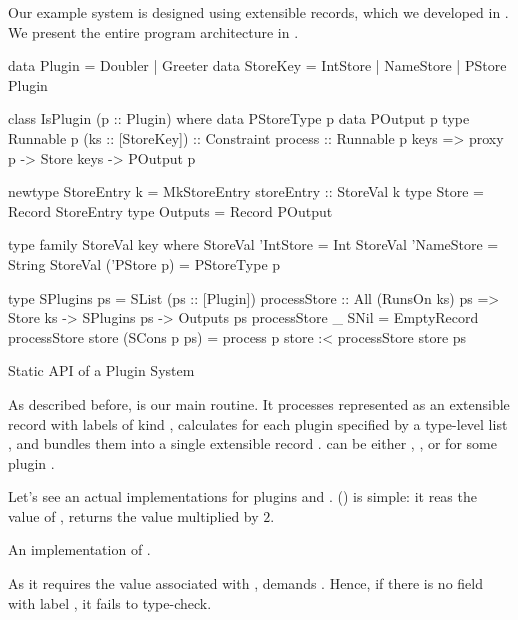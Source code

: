 \documentclass[demotion-paper.tex]{subfiles}
\begin{document}
Our example system is designed using extensible records, which we developed in .
We present the entire program architecture in .
\begin{listing}[htbp]
\begin{code}
data Plugin = Doubler | Greeter
data StoreKey = IntStore | NameStore
              | PStore Plugin

class IsPlugin (p :: Plugin) where
  data PStoreType p
  data POutput p
  type Runnable p (ks :: [StoreKey]) :: Constraint
  process :: Runnable p keys
    => proxy p -> Store keys -> POutput p

newtype StoreEntry k =
  MkStoreEntry {storeEntry :: StoreVal k}
type Store = Record StoreEntry
type Outputs = Record POutput

type family StoreVal key where
  StoreVal 'IntStore = Int
  StoreVal 'NameStore = String
  StoreVal ('PStore p) = PStoreType p

type SPlugins ps = SList (ps :: [Plugin])
processStore :: All (RunsOn ks) ps
  => Store ks -> SPlugins ps -> Outputs ps
processStore _ SNil = EmptyRecord
processStore store (SCons p ps) = 
  process p store :< processStore store ps
\end{code}
\caption{Static API of a Plugin System}
\label{lst:plugin-arch}
\end{listing}
As described before,  is our main routine.
It processes  represented as an extensible record with labels of kind , calculates  for each plugin specified by a type-level list , and bundles them into a single extensible record .
 can be either , , or  for some plugin .

Let's see an actual implementations for plugins  and .
 () is simple: it reas the value of , returns the value multiplied by $2$.
\begin{listing}[tbp]
\caption{An implementation of .}
\label{lst:plugin-double}
\end{listing}
As it requires the value associated with ,  demands .
Hence, if there is no field with label , it fails to type-check.
\end{document}

